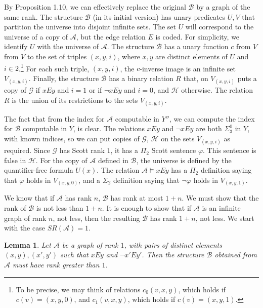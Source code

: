 \documentclass{article}
\newtheorem{lem}[thm]{Lemma}
\begin{document}
By Proposition 1.10, we can effectively replace the original $\mathcal{B}$ by a graph of the same rank.  The structure $\mathcal{B}$ (in its initial version) has unary predicates $U,V$ that partition the universe into disjoint infinite sets.  The set $U$ will correspond to the universe of a copy of $\mathcal{A}$, but the edge relation $E$ is coded.  For simplicity, we identify $U$ with the universe of $\mathcal{A}$.  The structure $\mathcal{B}$ has a unary function $c$ from $V$ from $V$ to the set of triples $(x,y,i)$, where $x,y$ are distinct elements of $U$ and $i\in 2$.\footnote{To be precise, we may think of relations $c_0(v,x,y)$, which holds if $c(v) = (x,y,0)$, and $c_1(v,x,y)$, which holds if $c(v) = (x,y,1)$.}  For each such triple, $(x,y,i)$, the $c$-inverse image is an infinite set $V_{(x,y,i)}$.  Finally, the  structure $\mathcal{B}$ has a binary relation $R$ that, on $V_{(x,y,i)}$ puts a copy of 
$\mathcal{G}$ if $xEy$ and $i = 1$ or if $\neg{xEy}$ and $i = 0$, and $\mathcal{H}$ otherwise.  The relation $R$ is the union of its restrictions to the sets $V_{(x,y,i)}$.        

\bigskip

The fact that from the index for $\mathcal{A}$ computable in $Y''$, we can compute the index for $\mathcal{B}$ computable in $Y$, is clear.  The relations $xEy$ and $\neg{xEy}$ are both $\Sigma^0_3$ in $Y$, with known indices, so we can put copies of $\mathcal{G}$, $\mathcal{H}$ on the sets $V_{(x,y,i)}$ as required.  Since $\mathcal{G}$ has Scott rank $1$, it has a $\Pi_2$ Scott sentence $\varphi$.  This sentence is false in $\mathcal{H}$.  For the copy of $\mathcal{A}$ defined in $\mathcal{B}$, the universe is defined by the quantifier-free formula $U(x)$.  The relation $\mathcal{A}\models xEy$ has a $\Pi_2$ definition saying that $\varphi$ holds in $V_{(x,y,0)}$, and a $\Sigma_2$ definition saying that $\neg{\varphi}$ holds in $V_{(x,y,1)}$.     

We know that if $\mathcal{A}$ has rank $n$, $\mathcal{B}$ has rank at most $1+n$.  We must show that the rank of $\mathcal{B}$ is not less than $1+n$.  It is enough to show that if $\mathcal{A}$ is an infinite graph of rank $n$, not less, then the resulting $\mathcal{B}$ has rank $1+n$, not less.  We start with the case $SR(\mathcal{A}) = 1$.

\begin{lem}

Let $\mathcal{A}$ be a graph of rank $1$, with pairs of distinct elements $(x,y),(x',y')$ such that $xEy$ and $\neg{x'Ey'}$.  Then the structure $\mathcal{B}$ obtained from $\mathcal{A}$ must have rank greater than $1$.  

\end{lem}
\end{document}
